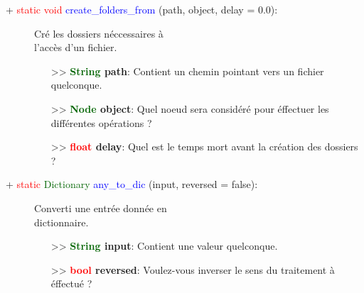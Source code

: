 \documentclass[a4paper, 11pt]{article}
\begin{document}
	\begin{description}
		\item [+ \textcolor{red}{static void} \textcolor{blue}{create\_folders\_from} (path, object, delay = 
		0.0):] Cré les dossiers néccessaires à \\l'accès d'un fichier.
		\begin{itemize}
			\item [>> \textbf{\textcolor{darkgreen}{String} path}:] Contient un chemin pointant vers un 
			fichier quelconque.
			\item [>> \textbf{\textcolor{darkgreen}{Node} object}:] Quel noeud sera considéré pour éffectuer
			les différentes opérations ?
			\item [>> \textbf{\textcolor{red}{float} delay}:] Quel est le temps mort avant la création des 
			dossiers ?\\
		\end{itemize}
	\end{description}
	\begin{description}
		\item [+ \textcolor{red}{static} \textcolor{darkgreen}{Dictionary} \textcolor{blue}{any\_to\_dic} 
		(input, reversed = false):] Converti une entrée donnée en \\dictionnaire.
		\begin{itemize}
			\item [>> \textbf{\textcolor{darkgreen}{String} input}:] Contient une valeur quelconque.
			\item [>> \textbf{\textcolor{red}{bool} reversed}:] Voulez-vous inverser le sens du traitement à 
			éffectué ?\\
		\end{itemize}
	\end{description}
\end{document}
